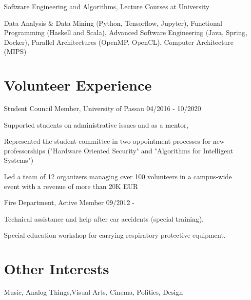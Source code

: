 \documentclass{article}
\renewenvironment{itemize}[1]{\begin{compactitem}#1}{\end{compactitem}}
\begin{document}
\ralewaysb Software Engineering and Algorithms, Lecture Courses at University \raleway 
\begin{itemize}[-]
  \item Data Analysis \& Data Mining (Python, Tensorflow, Jupyter), Functional Programming (Haskell and Scala), Advanced Software Engineering (Java, Spring, Docker), Parallel Architectures (OpenMP, OpenCL), Computer Architecture (MIPS)
\end{itemize}

\vspace{.9em}

\section{Volunteer Experience}

\ralewaysb Student Council Member, \raleway University of Passau \hfill 04/2016 - 10/2020
\begin{itemize}[-]
  \item Supported students on administrative issues and as a mentor, 
  \item Represented the student committee in two appointment processes for new professorships ("Hardware Oriented Security" and "Algorithms for Intelligent Systems")
  \item Led a team of 12 organizers managing over 100 volunteers in a campus-wide event with a revenue of more than 20K EUR

\end{itemize}

\ralewaysb Fire Department, \raleway Active Member \hfill 09/2012 - 
\begin{itemize}[-]
  \item Technical assistance and help after car accidents (special training).
  \item Special education workshop for carrying respiratory protective equipment.
\end{itemize}


\vspace{.9em}
\section{Other Interests}
Music, Analog Things,Visual Arts, Cinema, Politics, Design

\end{document}
